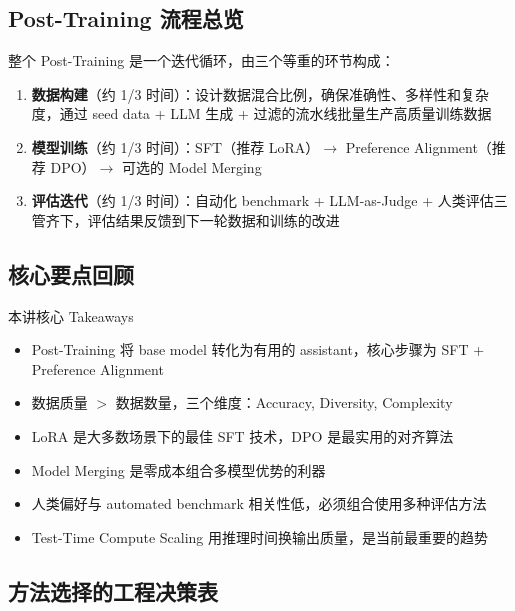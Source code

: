 \documentclass[a4paper]{article}
\begin{document}
\subsection{Post-Training 流程总览}

整个 Post-Training 是一个迭代循环，由三个等重的环节构成：

\begin{enumerate}
    \item \textbf{数据构建}（约 1/3 时间）：设计数据混合比例，确保准确性、多样性和复杂度，通过 seed data + LLM 生成 + 过滤的流水线批量生产高质量训练数据
    \item \textbf{模型训练}（约 1/3 时间）：SFT（推荐 LoRA）$\rightarrow$ Preference Alignment（推荐 DPO）$\rightarrow$ 可选的 Model Merging
    \item \textbf{评估迭代}（约 1/3 时间）：自动化 benchmark + LLM-as-Judge + 人类评估三管齐下，评估结果反馈到下一轮数据和训练的改进
\end{enumerate}

\subsection{核心要点回顾}

\begin{importantbox}{本讲核心 Takeaways}
\begin{itemize}
    \item Post-Training 将 base model 转化为有用的 assistant，核心步骤为 SFT + Preference Alignment
    \item 数据质量 $>$ 数据数量，三个维度：Accuracy, Diversity, Complexity
    \item LoRA 是大多数场景下的最佳 SFT 技术，DPO 是最实用的对齐算法
    \item Model Merging 是零成本组合多模型优势的利器
    \item 人类偏好与 automated benchmark 相关性低，必须组合使用多种评估方法
    \item Test-Time Compute Scaling 用推理时间换输出质量，是当前最重要的趋势
\end{itemize}
\end{importantbox}

\subsection{方法选择的工程决策表}
\end{document}
